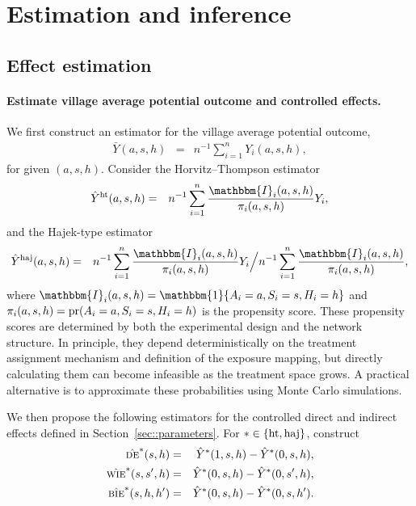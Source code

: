 \documentclass{article}
\newcommand{\pr}{\textup{pr}}
\newcommand{\sumi}{\sum_{i=1}^n}
\newcommand{\de}{\textsc{de}}
\newcommand{\bie}{\textsc{bie}}
\newcommand{\wie}{\textsc{wie}}
\newcommand{\horthom}{\textup{ht}}
\newcommand{\haj}{\textup{haj}}
\newcommand{\indicator}{\mathbbm{1}}
\newcommand{\bbI}{\mathbbm{I}}
\newcommand{\pscore}[1]{\pi_{#1}}
\begin{document}
\section{Estimation and inference}
\label{sec::estimation}

\subsection{Effect estimation}

\paragraph{Estimate village average potential outcome and controlled effects.}
We first construct an estimator for the village average potential outcome,
\begin{eqnarray*}
    \bar{Y}(a,s,h) &=& n^{-1}\sumi Y_{i}(a,s,h),
\end{eqnarray*}
for given $(a,s,h)$. Consider the Horvitz--Thompson estimator
\begin{eqnarray*}
    \hat{Y}^{\horthom}(a,s,h) &=& n^{-1}\sumi\frac{ \bbI_{i}(a,s,h)}{ \pscore{i}(a,s,h)}Y_{i},
\end{eqnarray*}
and the Hajek-type estimator
\begin{eqnarray*}
    \hat{Y}^{\haj}(a,s,h) &=& n^{-1}\sumi\frac{ \bbI_{i}(a,s,h) }{ \pscore{i}(a,s,h)}Y_{i} \Big / n^{-1}\sumi\frac{ \bbI_{i}(a,s,h)}{ \pscore{i}(a,s,h)},
\end{eqnarray*}
where $\bbI_{i}(a,s,h)=\indicator\{A_{i}=a,S_{i}=s,H_{i}=h\}$ and $\pscore{i}(a,s,h)=\pr(A_{i}=a, S_{i}=s, H_{i}=h)$ is the propensity score. These propensity scores are determined by both the experimental design and the network structure. In principle, they depend deterministically on the treatment assignment mechanism and definition of the exposure mapping, but directly calculating them can become infeasible as the treatment space grows. A practical alternative is to approximate these probabilities using Monte Carlo simulations.

We then propose the following estimators for the controlled direct and indirect effects defined in Section~\ref{sec::parameters}. For $*\in\{\horthom,\haj\}$, construct
\begin{eqnarray*}
    \hat{\de}^{*}(s,h) &=& \hat{Y}^{*}(1,s,h) - \hat{Y}^{*}(0,s,h), \\
    \hat{\wie}^{*}(s,s^{\prime},h) &=& \hat{Y}^{*}(0,s,h) - \hat{Y}^{*}(0,s^{\prime},h), \\
    \hat{\bie}^{*}(s,h,h^{\prime}) &=& \hat{Y}^{*}(0,s,h) - \hat{Y}^{*}(0,s,h^{\prime}).
\end{eqnarray*}
\end{document}
